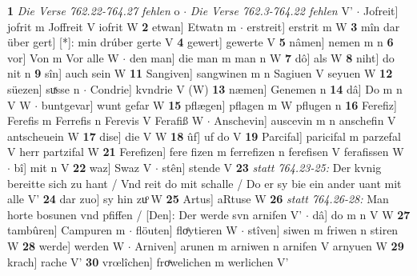 \documentclass[8pt,a4paper,notitlepage]{article}
\begin{document}
\begin{table}[ht]
\begin{minipage}[t]{0.5\linewidth}
\textbf{1} \textit{Die Verse 762.22-764.27 fehlen} o   $\cdot$ \textit{Die Verse 762.3-764.22 fehlen} V'   $\cdot$ Jofreit] jofrit m Joffreit V iofrit W \textbf{2} etwan] Etwatn m  $\cdot$ erstreit] erstrit m W \textbf{3} mîn dar über gert] [*]: min drúber gerte V \textbf{4} gewert] gewerte V \textbf{5} nâmen] nemen m n \textbf{6} vor] Von m Vor alle W  $\cdot$ den man] die man m man n W \textbf{7} dô] als W \textbf{8} niht] do nit n \textbf{9} sîn] auch sein W \textbf{11} Sangiven] sangwinen m n Sagiuen V seyuen W \textbf{12} süezen] suͯsse n  $\cdot$ Condrie] kvndrie V (W) \textbf{13} næmen] Genemen n \textbf{14} dâ] Do m n V W  $\cdot$ buntgevar] wunt gefar W \textbf{15} pflægen] pflagen m W pflugen n \textbf{16} Ferefiz] Ferefis m Ferrefis n Ferevis V Ferafiß W  $\cdot$ Anschevin] auscevin m n anschefin V antscheuein W \textbf{17} dise] die V W \textbf{18} ûf] uf do V \textbf{19} Parcifal] paricifal m parzefal V herr partzifal W \textbf{21} Ferefizen] fere fizen m ferrefizen n ferefisen V ferafissen W  $\cdot$ bî] mit n V \textbf{22} waz] Swaz V  $\cdot$ stên] stende V \textbf{23} \textit{statt 764.23-25:} Der kvnig bereitte sich zu hant / Vnd reit do mit schalle / Do er sy bie ein ander uant mit alle V'  \textbf{24} dar zuo] sy hin zuͦ W \textbf{25} Artus] aRtuse W \textbf{26} \textit{statt 764.26-28:} Man horte bosunen vnd pfiffen / [Den]: Der werde svn arnifen V'   $\cdot$ dâ] do m n V W \textbf{27} tambûren] Campuren m  $\cdot$ flöuten] floͤytieren W  $\cdot$ stîven] siwen m friwen n stiren W \textbf{28} werde] werden W  $\cdot$ Arniven] arunen m arniwen n arnifen V arnyuen W \textbf{29} krach] rache V' \textbf{30} vrœlîchen] froͯwelichen m werlichen V' \newline
\end{minipage}
\end{table}
\newpage
\end{document}
